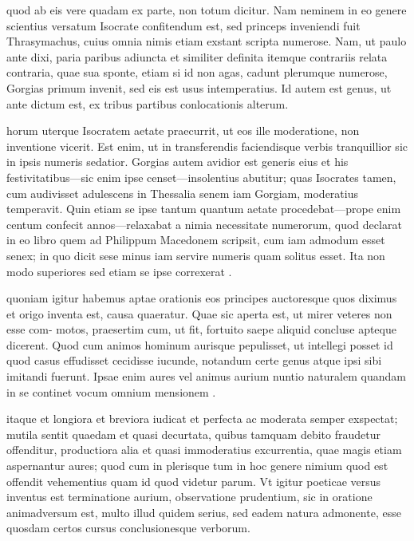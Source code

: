  quod ab eis vere quadam ex parte, non totum dicitur. Nam neminem in eo genere scientius versatum Isocrate confitendum est, sed princeps inveniendi fuit Thrasymachus, cuius omnia nimis etiam exstant scripta numerose. Nam, ut paulo ante dixi, paria paribus adiuncta et similiter definita itemque contrariis relata contraria, quae sua sponte, etiam si id non agas, cadunt plerumque numerose, Gorgias primum invenit, sed eis est usus intemperatius. Id autem est genus, ut ante dictum est, ex tribus partibus conlocationis alterum.

 horum uterque Isocratem aetate praecurrit, ut eos ille moderatione, non inventione vicerit. Est enim, ut in transferendis faciendisque verbis tranquillior sic in ipsis numeris sedatior. Gorgias autem avidior est generis eius et his festivitatibus—sic enim ipse censet—insolentius abutitur; quas Isocrates tamen, cum audivisset adulescens in Thessalia senem iam Gorgiam, moderatius temperavit. Quin etiam se ipse tantum quantum aetate procedebat—prope enim centum confecit annos—relaxabat a nimia necessitate numerorum, quod declarat in eo libro quem ad Philippum Macedonem scripsit, cum iam admodum esset senex; in quo dicit sese minus iam servire numeris quam solitus esset. Ita non modo superiores sed etiam se ipse correxerat .

 quoniam igitur habemus aptae orationis eos principes auctoresque quos diximus et origo inventa est, causa quaeratur. Quae sic aperta est, ut mirer veteres non esse com- motos, praesertim cum, ut fit, fortuito saepe aliquid concluse apteque dicerent. Quod cum animos hominum aurisque pepulisset, ut intellegi posset id quod casus effudisset cecidisse iucunde, notandum certe genus atque ipsi sibi imitandi fuerunt. Ipsae enim aures vel animus aurium nuntio naturalem quandam in se continet vocum omnium mensionem .

 itaque et longiora et breviora iudicat et perfecta ac moderata semper exspectat; mutila sentit quaedam et quasi decurtata, quibus tamquam debito fraudetur offenditur, productiora alia et quasi immoderatius excurrentia, quae magis etiam aspernantur aures; quod cum in plerisque tum in hoc genere nimium quod est offendit vehementius quam id quod videtur parum. Vt igitur poeticae versus inventus est terminatione aurium, observatione prudentium, sic in oratione animadversum est, multo illud quidem serius, sed eadem natura admonente, esse quosdam certos cursus conclusionesque verborum.


